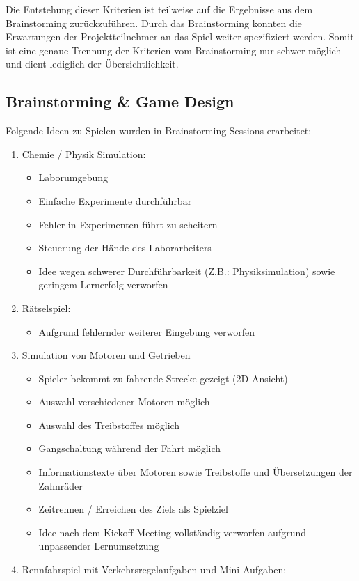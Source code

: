 Die Entstehung dieser Kriterien ist teilweise auf die Ergebnisse aus dem Brainstorming zurückzuführen. Durch das Brainstorming konnten die Erwartungen der Projektteilnehmer an das Spiel weiter spezifiziert werden. Somit ist eine genaue Trennung der Kriterien vom Brainstorming nur schwer möglich und dient lediglich der Übersichtlichkeit.

\subsection{Brainstorming \& Game Design}\label{ssec:idee}
	Folgende Ideen zu Spielen wurden in Brainstorming-Sessions erarbeitet:
\begin{enumerate}
	\item{Chemie / Physik Simulation:}
	\begin{itemize}
		\item{Laborumgebung}
		\item{Einfache Experimente durchführbar}
		\item{Fehler in Experimenten führt zu scheitern}
		\item{Steuerung der Hände des Laborarbeiters}
		\item{Idee wegen schwerer Durchführbarkeit (Z.B.: Physiksimulation) sowie geringem Lernerfolg verworfen}
	\end{itemize}
	\item{Rätselspiel:}
	\begin{itemize}
		\item{Aufgrund fehlernder weiterer Eingebung verworfen}
	\end{itemize}
	\item{Simulation von Motoren und Getrieben}
	\begin{itemize}
		\item{Spieler bekommt zu fahrende Strecke gezeigt (2D Ansicht)}
		\item{Auswahl verschiedener Motoren möglich}
		\item{Auswahl des Treibstoffes möglich}
		\item{Gangschaltung während der Fahrt möglich}
		\item{Informationstexte über Motoren sowie Treibstoffe und Übersetzungen der Zahnräder}
		\item{Zeitrennen / Erreichen des Ziels als Spielziel}
		\item{Idee nach dem Kickoff-Meeting vollständig verworfen aufgrund unpassender Lernumsetzung}
	\end{itemize}
	\item{Rennfahrspiel mit Verkehrsregelaufgaben und Mini Aufgaben:}

\end{enumerate}
